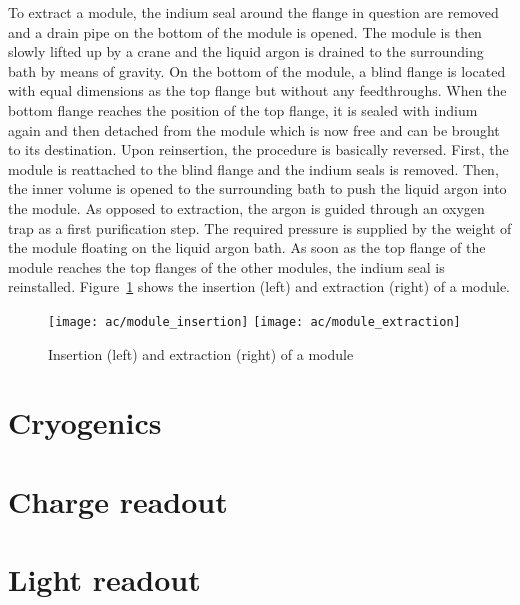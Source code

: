To extract a module, the indium seal around the flange in question are removed and a drain pipe on the bottom of the module is opened.
The module is then slowly lifted up by a crane and the liquid argon is drained to the surrounding bath by means of gravity.
On the bottom of the module, a blind flange is located with equal dimensions as the top flange but without any feedthroughs.
When the bottom flange reaches the position of the top flange, it is sealed with indium again and then detached from the module which is now free and can be brought to its destination.
Upon reinsertion, the procedure is basically reversed.
First, the module is reattached to the blind flange and the indium seals is removed.
Then, the inner volume is opened to the surrounding bath to push the liquid argon into the module.
As opposed to extraction, the argon is guided through an oxygen trap as a first purification step.
The required pressure is supplied by the weight of the module floating on the liquid argon bath.
As soon as the top flange of the module reaches the top flanges of the other modules, the indium seal is reinstalled.
Figure~\ref{fig:ac_module-ins-ext} shows the insertion (left) and extraction (right) of a module.

\begin{figure}[htb] %
	\centering
	\texttt{[image: ac/module\_insertion]}
	\texttt{[image: ac/module\_extraction]}
	\caption{Insertion (left) and extraction (right) of a module}
	\label{fig:ac_module-ins-ext}
\end{figure}


\section{Cryogenics\label{sec:ac_cryo}}


\section{Charge readout\label{ac_charge-readout}}


\section{Light readout\label{ac_light-readout}}